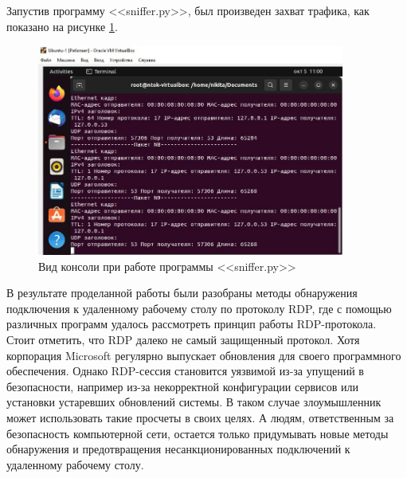 \documentclass[bachelor, och, coursework]{SCWorks}
\begin{document}
  Запустив программу <<sniffer.py>>, был произведен захват трафика, как показано на рисунке \ref{cmd-strt}.
  
  \begin{figure}[H]
    \centering
    \includegraphics[width=0.9\textwidth]{photo/cmd-start.jpg}
    \caption{Вид консоли при работе программы <<sniffer.py>>}
    \label{cmd-strt}
  \end{figure}
  
  
  \conclusion
  
  В результате проделанной работы были разобраны методы обнаружения подключения к удаленному рабочему столу по протоколу RDP, где с помощью различных программ
  удалось рассмотреть принцип работы RDP-протокола. Стоит отметить, что RDP далеко не самый защищенный протокол. Хотя корпорация Microsoft регулярно
  выпускает обновления для своего программного обеспечения. Однако RDP-сессия становится уязвимой из-за упущений в безопасности, например из-за
  некорректной конфигурации сервисов или установки устаревших обновлений системы. В таком случае злоумышленник может использовать такие просчеты в своих целях.
  А людям, ответственным за безопасность компьютерной сети, остается только придумывать новые методы обнаружения и предотвращения несанкционированных подключений
  к удаленному рабочему столу.
\end{document}
